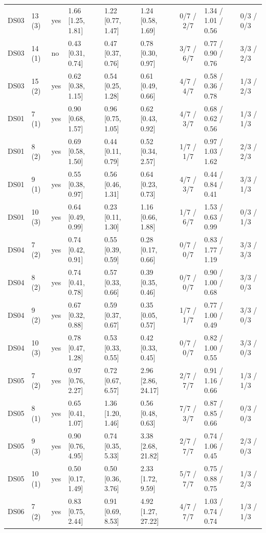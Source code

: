 \documentclass[10pt]{article}
\begin{document}
{\begin{longtable}{llllllcll}
DS03 & 13 (3) & yes & 1.66 [1.25, 1.81] & 1.22 [0.77, 1.47] & 1.24 [0.58, 1.69] & 0/7 / 2/7 & 1.34 / 1.01 / 0.56 & 0/3 / 0/3 \\
DS03 & 14 (1) & no & 0.43 [0.31, 0.74] & 0.47 [0.37, 0.76] & 0.78 [0.30, 0.97] & 3/7 / 6/7 & 0.77 / 0.90 / 0.76 & 3/3 / 2/3 \\
DS03 & 15 (2) & yes & 0.62 [0.38, 1.15] & 0.54 [0.25, 1.28] & 0.61 [0.49, 0.66] & 4/7 / 4/7 & 0.58 / 0.36 / 0.78 & 1/3 / 2/3 \\
\midrule
DS01 & 7 (1) & yes & 0.90 [0.68, 1.57] & 0.96 [0.75, 1.05] & 0.62 [0.43, 0.92] & 4/7 / 3/7 & 0.68 / 0.62 / 0.56 & 1/3 / 1/3 \\
DS01 & 8 (2) & yes & 0.69 [0.58, 1.50] & 0.44 [0.11, 0.79] & 0.52 [0.34, 2.57] & 1/7 / 1/7 & 0.97 / 1.03 / 1.62 & 2/3 / 2/3 \\
DS01 & 9 (1) & yes & 0.55 [0.38, 0.97] & 0.56 [0.46, 1.31] & 0.64 [0.23, 0.73] & 4/7 / 3/7 & 0.44 / 0.84 / 0.41 & 3/3 / 1/3 \\
DS01 & 10 (3) & yes & 0.64 [0.49, 0.99] & 0.23 [0.11, 1.30] & 1.16 [0.66, 1.88] & 1/7 / 6/7 & 1.53 / 0.63 / 0.99 & 0/3 / 1/3 \\
\midrule
DS04 & 7 (2) & yes & 0.74 [0.42, 0.91] & 0.55 [0.39, 0.59] & 0.28 [0.17, 0.66] & 0/7 / 0/7 & 0.83 / 1.77 / 1.19 & 3/3 / 3/3 \\
DS04 & 8 (2) & yes & 0.74 [0.41, 0.78] & 0.57 [0.33, 0.66] & 0.39 [0.35, 0.46] & 0/7 / 0/7 & 0.90 / 1.00 / 0.68 & 3/3 / 0/3 \\
DS04 & 9 (2) & yes & 0.67 [0.32, 0.88] & 0.59 [0.37, 0.67] & 0.35 [0.05, 0.57] & 1/7 / 1/7 & 0.77 / 1.00 / 0.49 & 3/3 / 0/3 \\
DS04 & 10 (3) & yes & 0.78 [0.47, 1.28] & 0.53 [0.33, 0.55] & 0.42 [0.33, 0.45] & 0/7 / 0/7 & 0.82 / 1.00 / 0.55 & 3/3 / 0/3 \\
\midrule
DS05 & 7 (2) & yes & 0.97 [0.76, 2.27] & 0.72 [0.67, 6.57] & 2.96 [2.86, 24.17] & 2/7 / 7/7 & 0.91 / 1.16 / 0.66 & 1/3 / 1/3 \\
DS05 & 8 (1) & yes & 0.65 [0.41, 1.07] & 1.36 [1.20, 1.46] & 0.56 [0.48, 0.63] & 7/7 / 3/7 & 0.87 / 0.85 / 0.66 & 0/3 / 0/3 \\
DS05 & 9 (3) & yes & 0.90 [0.76, 4.95] & 0.74 [0.35, 5.33] & 3.38 [2.68, 21.82] & 2/7 / 7/7 & 0.74 / 1.06 / 0.45 & 2/3 / 0/3 \\
DS05 & 10 (1) & yes & 0.50 [0.17, 1.49] & 0.50 [0.36, 3.76] & 2.33 [1.72, 9.59] & 5/7 / 7/7 & 0.75 / 0.88 / 0.75 & 1/3 / 2/3 \\
\midrule
DS06 & 7 (2) & yes & 0.83 [0.75, 2.44] & 0.91 [0.69, 8.53] & 4.92 [1.27, 27.22] & 4/7 / 7/7 & 1.03 / 0.74 / 0.74 & 1/3 / 1/3 \\

\end{longtable}}
\end{document}
